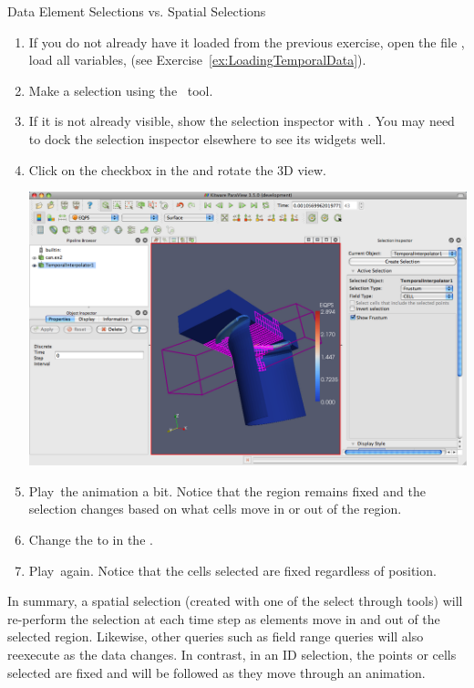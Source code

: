\begin{exercise}{Data Element Selections vs. Spatial Selections}
  \label{ex:DataElementSelectionsVsSpatialSelections}%
  \begin{enumerate}
  \item If you do not already have it loaded from the previous exercise,
    open the file , load all variables, \apply (see
    Exercise~\ref{ex:LoadingTemporalData}).
  \item Make a selection using the ~\selectCellsThrough tool.
  \item If it is not already visible, show the selection inspector
    with  \ra {}.  You may need to dock
    the selection inspector elsewhere to see its widgets well.
  \item Click on the  checkbox in the  and rotate the 3D view.

    \begin{inlinefig}
      \includegraphics[width=\scw]{images/SelectionFrustum}
    \end{inlinefig}

  \item Play~\vcrPlay the animation a bit.  Notice that the region remains
    fixed and the selection changes based on what cells move in or out of
    the region.
  \item Change the  to  in the .
  \item Play~\vcrPlay again.  Notice that the cells selected are fixed
    regardless of position.
  \end{enumerate}

  In summary, a spatial selection (created with one of the select through
  tools) will re-perform the selection at each time step as elements move
  in and out of the selected region.  Likewise, other queries such as field
  range queries will also reexecute as the data changes.  In contrast, in
  an ID selection, the points or cells selected are fixed and will be
  followed as they move through an animation.
\end{exercise}

